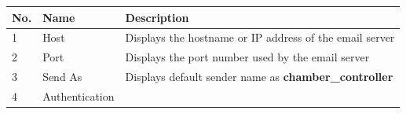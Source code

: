 \begin{longtable}[]{@{}lll@{}}
\toprule
\begin{minipage}[b]{0.19\columnwidth}\raggedright
No.\strut
\end{minipage} & \begin{minipage}[b]{0.23\columnwidth}\raggedright
Name\strut
\end{minipage} & \begin{minipage}[b]{0.49\columnwidth}\raggedright
Description\strut
\end{minipage}\tabularnewline
\midrule
\endhead
\begin{minipage}[t]{0.19\columnwidth}\raggedright
1\strut
\end{minipage} & \begin{minipage}[t]{0.23\columnwidth}\raggedright
Host\strut
\end{minipage} & \begin{minipage}[t]{0.49\columnwidth}\raggedright
Displays the hostname or IP address of the email server\strut
\end{minipage}\tabularnewline
\begin{minipage}[t]{0.19\columnwidth}\raggedright
2\strut
\end{minipage} & \begin{minipage}[t]{0.23\columnwidth}\raggedright
Port\strut
\end{minipage} & \begin{minipage}[t]{0.49\columnwidth}\raggedright
Displays the port number used by the email server\strut
\end{minipage}\tabularnewline
\begin{minipage}[t]{0.19\columnwidth}\raggedright
3\strut
\end{minipage} & \begin{minipage}[t]{0.23\columnwidth}\raggedright
Send As\strut
\end{minipage} & \begin{minipage}[t]{0.49\columnwidth}\raggedright
Displays default sender name as \textbf{chamber\_controller}\strut
\end{minipage}\tabularnewline
\begin{minipage}[t]{0.19\columnwidth}\raggedright
4\strut
\end{minipage} & \begin{minipage}[t]{0.23\columnwidth}\raggedright
Authentication\strut
\end{minipage} & \begin{minipage}[t]{0.49\columnwidth}\raggedright

\end{minipage}
\end{longtable}
